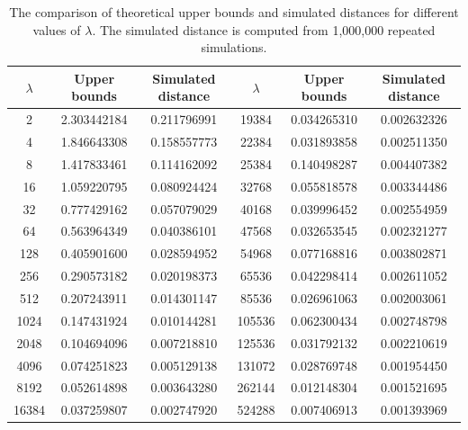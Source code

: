 \documentclass[pdflatex,sn-mathphys-ay]{sn-jnl}
\theoremstyle{thmstyleone}%
\theoremstyle{thmstyletwo}%
\theoremstyle{thmstylethree}%
\begin{document}
		
		\begin{table}[htbp]
			\centering
			\begin{tabular}{|c|c|c|c|c|c|}
				\hline
				$\lambda$ & Upper bounds & Simulated distance &  $\lambda$ & Upper bounds & Simulated distance \\
				\hline
				2      & 2.303442184 & 0.211796991 & 19384  & 0.034265310& 0.002632326 \\
				4      & 1.846643308 & 0.158557773 & 22384  & 0.031893858& 0.002511350
                \\
				8      & 1.417833461 & 0.114162092 & 25384  & 0.140498287& 0.004407382 \\
				16     & 1.059220795 & 0.080924424 & 32768  & 0.055818578& 0.003344486 \\
				32     & 0.777429162 & 0.057079029 & 40168  & 0.039996452& 0.002554959 \\
				64     & 0.563964349 & 0.040386101 & 47568  & 0.032653545& 0.002321277 \\
				128    & 0.405901600 & 0.028594952 & 54968  & 0.077168816& 0.003802871 \\
				256    & 0.290573182 & 0.020198373 & 65536  & 0.042298414& 0.002611052 \\
				512    & 0.207243911 & 0.014301147 & 85536  & 0.026961063& 0.002003061 \\
				1024   & 0.147431924 & 0.010144281 & 105536 & 0.062300434& 0.002748798 \\
				2048   & 0.104694096 & 0.007218810 & 125536 & 0.031792132& 0.002210619 \\
				4096   & 0.074251823 & 0.005129138 & 131072 & 0.028769748& 0.001954450 \\
				8192   & 0.052614898 & 0.003643280 & 262144 & 0.012148304& 0.001521695 \\
				16384  & 0.037259807 & 0.002747920  & 524288 & 0.007406913& 0.001393969
                \\
				\hline
			\end{tabular}
			\caption{The comparison of theoretical upper bounds and simulated distances for different values of $\lambda$. The simulated distance is computed from 1,000,000 repeated simulations.}
            \label{tab:AI}
		\end{table}
\end{document}

